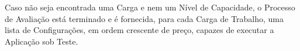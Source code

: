 Caso não seja encontrada uma Carga e nem um Nível de Capacidade, o Processo de 
Avaliação está terminado e é fornecida, para cada Carga de Trabalho, uma lista 
de Configurações, em ordem crescente de preço, capazes de executar a Aplicação 
sob Teste.  
 
